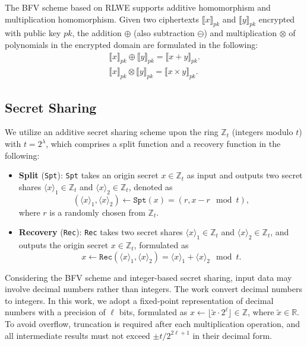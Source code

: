 ﻿\documentclass[conference]{IEEEtran}
\newcommand{\Spt}{\texttt{Spt}}
\newcommand{\Rec}{\texttt{Rec}}
\begin{document}
The BFV scheme based on RLWE supports additive homomorphism and multiplication homomorphism. Given two ciphertexts $\llbracket x \rrbracket_{pk}$ and $\llbracket y \rrbracket_{pk}$ encrypted with public key $pk$, the addition $\oplus$ (also subtraction $\ominus$) and multiplication $\otimes$ of polynomials in the encrypted domain are formulated in the following:
\begin{equation*}
\begin{array}{c}
    \llbracket x \rrbracket_{pk} \oplus \llbracket y \rrbracket_{pk} = \llbracket x + y \rrbracket_{pk}. \\
    \llbracket x \rrbracket_{pk} \otimes \llbracket y \rrbracket_{pk} = \llbracket x \times y \rrbracket_{pk}.    
\end{array}
\end{equation*}

\subsection{Secret Sharing}\label{SS}
We utilize an additive secret sharing scheme upon the ring $\mathbb{Z}_t$ (integers modulo $t$) with $t = 2^\lambda$, which comprises a split function and a recovery function in the following:
\begin{itemize}
\item \textbf{Split} (\Spt): \texttt{Spt} takes an origin secret $x \in \mathbb{Z}_t$ as input and outputs two secret shares $\langle x \rangle_1 \in \mathbb{Z}_t$ and $\langle x \rangle_2 \in \mathbb{Z}_t$, denoted as
\begin{equation}
    (\langle x \rangle_1, \langle x \rangle_2) \gets \Spt(x) = (r, x - r\!\!\!\mod t),
\end{equation}
where $r$ is a randomly chosen from $\mathbb{Z}_t$.

\item \textbf{Recovery} (\Rec): \texttt{Rec} takes two secret shares $\langle x \rangle_1 \in \mathbb{Z}_t$ and $\langle x \rangle_2 \in \mathbb{Z}_t$, and outputs the origin secret $x \in \mathbb{Z}_t$, formulated as
\begin{equation}
     x \gets \Rec(\langle x \rangle_1, \langle x \rangle_2) = \langle x \rangle_1 + \langle x \rangle_2\!\!\!\mod t.
\end{equation}
\end{itemize}

Considering the BFV scheme and integer-based secret sharing, input data may involve decimal numbers rather than integers. The work \cite{liu2024pencilprivateextensiblecollaborative,8611203} convert decimal numbers to integers. In this work, we adopt a fixed-point representation of decimal numbers with a precision of $\ell$ bits, formulated as $x \gets \lfloor \tilde{x} \cdot 2^\ell \rfloor \in \mathbb{Z}$, where $\tilde{x} \in \mathbb{R}$. To avoid overflow, truncation is required after each multiplication operation, and all intermediate results must not exceed $\pm t/2^{2\ell + 1}$ in their decimal form.
\end{document}
